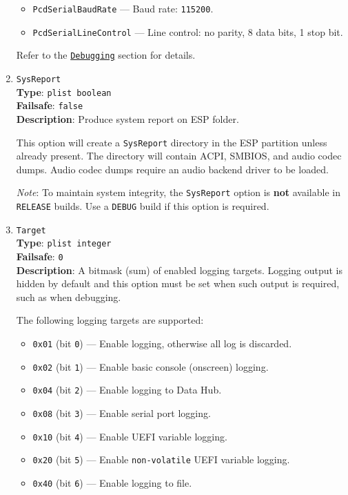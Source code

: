 \documentclass[]{article}
\providecommand{\tightlist}{%
  \setlength{\itemsep}{0pt}\setlength{\parskip}{0pt}}
\begin{document}
\begin{enumerate}
  \begin{itemize}
  \tightlist
    \item \texttt{PcdSerialBaudRate} --- Baud rate: \texttt{115200}.
    \item \texttt{PcdSerialLineControl} --- Line control: no parity, 8 data bits, 1 stop bit.
  \end{itemize}

  Refer to the \hyperref[troubleshootingdebug]{\texttt{Debugging}} section for details.

\item
  \texttt{SysReport}\\
  \textbf{Type}: \texttt{plist\ boolean}\\
  \textbf{Failsafe}: \texttt{false}\\
  \textbf{Description}: Produce system report on ESP folder.

  This option will create a \texttt{SysReport} directory in the ESP partition
  unless already present. The directory will contain ACPI, SMBIOS, and audio codec dumps.
  Audio codec dumps require an audio backend driver to be loaded.

  \emph{Note}: To maintain system integrity, the \texttt{SysReport} option is \textbf{not}
  available in \texttt{RELEASE} builds. Use a \texttt{DEBUG} build if this option is required.

\item
  \texttt{Target}\\
  \textbf{Type}: \texttt{plist\ integer}\\
  \textbf{Failsafe}: \texttt{0}\\
  \textbf{Description}: A bitmask (sum) of enabled logging targets.
  Logging output is hidden by default and this option must be set
  when such output is required, such as when debugging.

  The following logging targets are supported:

  \begin{itemize}
  \tightlist
    \item \texttt{0x01} (bit \texttt{0}) --- Enable logging, otherwise all log is discarded.
    \item \texttt{0x02} (bit \texttt{1}) --- Enable basic console (onscreen) logging.
    \item \texttt{0x04} (bit \texttt{2}) --- Enable logging to Data Hub.
    \item \texttt{0x08} (bit \texttt{3}) --- Enable serial port logging.
    \item \texttt{0x10} (bit \texttt{4}) --- Enable UEFI variable logging.
    \item \texttt{0x20} (bit \texttt{5}) --- Enable \texttt{non-volatile} UEFI variable logging.
    \item \texttt{0x40} (bit \texttt{6}) --- Enable logging to file.
  \end{itemize}


\end{enumerate}
\end{document}
